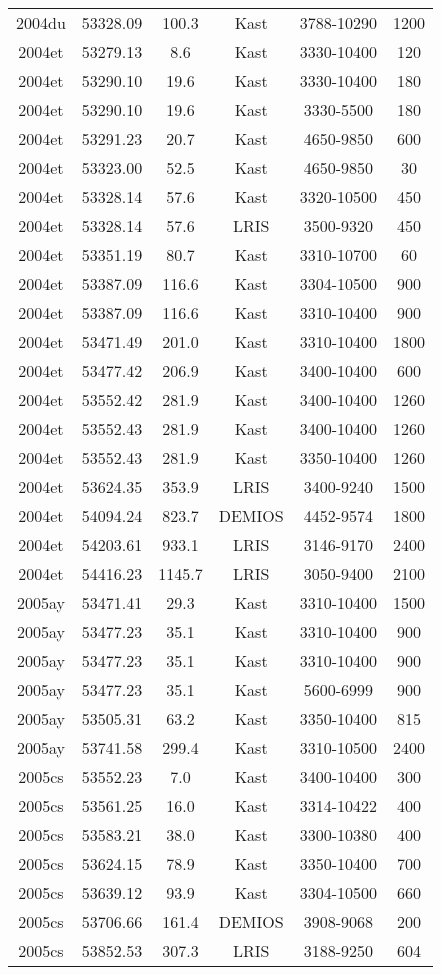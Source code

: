 \begin{table*}
\begin{tabular}{cccccc}
2004du	 & 53328.09	 &100.3	 &Kast	 & 3788-10290 &1200 \\ 
2004et	 & 53279.13	 &8.6	 &Kast	 & 3330-10400 &120 \\ 
2004et	 & 53290.10	 &19.6	 &Kast	 & 3330-10400 &180 \\ 
2004et	 & 53290.10	 &19.6	 &Kast	 & 3330-5500 &180 \\ 
2004et	 & 53291.23	 &20.7	 &Kast	 & 4650-9850 &600 \\ 
2004et	 & 53323.00	 &52.5	 &Kast	 & 4650-9850 &30 \\ 
2004et	 & 53328.14	 &57.6	 &Kast	 & 3320-10500 &450 \\ 
2004et	 & 53328.14	 &57.6	 &LRIS	 & 3500-9320 &450 \\ 
2004et	 & 53351.19	 &80.7	 &Kast	 & 3310-10700 &60 \\ 
2004et	 & 53387.09	 &116.6	 &Kast	 & 3304-10500 &900 \\ 
2004et	 & 53387.09	 &116.6	 &Kast	 & 3310-10400 &900 \\ 
2004et	 & 53471.49	 &201.0	 &Kast	 & 3310-10400 &1800 \\ 
2004et	 & 53477.42	 &206.9	 &Kast	 & 3400-10400 &600 \\ 
2004et	 & 53552.42	 &281.9	 &Kast	 & 3400-10400 &1260 \\ 
2004et	 & 53552.43	 &281.9	 &Kast	 & 3400-10400 &1260 \\ 
2004et	 & 53552.43	 &281.9	 &Kast	 & 3350-10400 &1260 \\ 
2004et	 & 53624.35	 &353.9	 &LRIS	 & 3400-9240 &1500 \\ 
2004et	 & 54094.24	 &823.7	 &DEMIOS	 & 4452-9574 &1800 \\ 
2004et	 & 54203.61	 &933.1	 &LRIS	 & 3146-9170 &2400 \\ 
2004et	 & 54416.23	 &1145.7	 &LRIS	 & 3050-9400 &2100 \\ 
2005ay	 & 53471.41	 &29.3	 &Kast	 & 3310-10400 &1500 \\ 
2005ay	 & 53477.23	 &35.1	 &Kast	 & 3310-10400 &900 \\ 
2005ay	 & 53477.23	 &35.1	 &Kast	 & 3310-10400 &900 \\ 
2005ay	 & 53477.23	 &35.1	 &Kast	 & 5600-6999 &900 \\ 
2005ay	 & 53505.31	 &63.2	 &Kast	 & 3350-10400 &815 \\ 
2005ay	 & 53741.58	 &299.4	 &Kast	 & 3310-10500 &2400 \\ 
2005cs	 & 53552.23	 &7.0	 &Kast	 & 3400-10400 &300 \\ 
2005cs	 & 53561.25	 &16.0	 &Kast	 & 3314-10422 &400 \\ 
2005cs	 & 53583.21	 &38.0	 &Kast	 & 3300-10380 &400 \\ 
2005cs	 & 53624.15	 &78.9	 &Kast	 & 3350-10400 &700 \\ 
2005cs	 & 53639.12	 &93.9	 &Kast	 & 3304-10500 &660 \\ 
2005cs	 & 53706.66	 &161.4	 &DEMIOS	 & 3908-9068 &200 \\ 
2005cs	 & 53852.53	 &307.3	 &LRIS	 & 3188-9250 &604 \\ 
\hline
\end{tabular}
\label{t:spec}
\end{table*}
